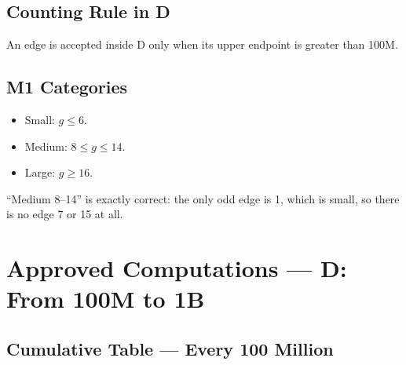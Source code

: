 \documentclass[12pt,a4paper]{article}
\begin{document}
\subsection{Counting Rule in D}

An edge is accepted inside D only when its upper endpoint is greater than 100M.

\subsection{M1 Categories}

\begin{itemize}
\item Small: $g \leq 6$.
\item Medium: $8 \leq g \leq 14$.
\item Large: $g \geq 16$.
\end{itemize}

``Medium 8--14'' is exactly correct: the only odd edge is 1, which is small, so there is no edge 7 or 15 at all.

\section{Approved Computations — D: From 100M to 1B}

\subsection{Cumulative Table — Every 100 Million}
\end{document}
